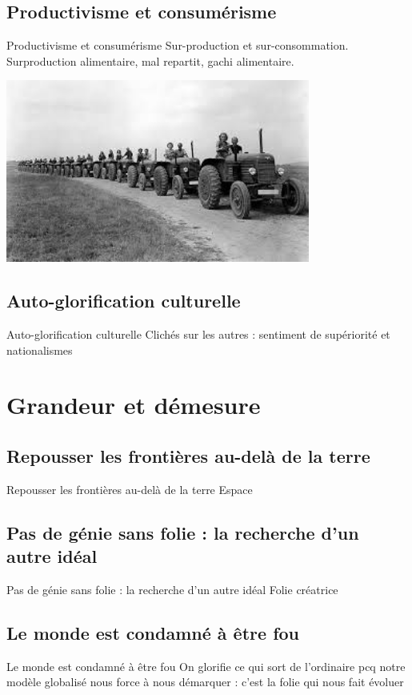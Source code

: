 \documentclass{beamer}
\begin{document}
\subsection{Productivisme et consumérisme}
\begin{frame}{Productivisme et consumérisme}
  Sur-production et sur-consommation.
  Surproduction alimentaire, mal repartit, gachi alimentaire.
  \begin{center}
    \includegraphics[width=10cm]{../Images/urss.png}
  \end{center}
\end{frame}

\subsection{Auto-glorification culturelle}
\begin{frame}{Auto-glorification culturelle}
  Clichés sur les autres : sentiment de supériorité et nationalismes
\end{frame}


\section{Grandeur et démesure}

\subsection{Repousser les frontières au-delà de la terre}
\begin{frame}{Repousser les frontières au-delà de la terre}
  Espace
\end{frame}

\subsection{Pas de génie sans folie : la recherche d'un autre idéal}
\begin{frame}{Pas de génie sans folie : la recherche d'un autre idéal}
  Folie créatrice
\end{frame}

\subsection{Le monde est condamné à être fou}
\begin{frame}{Le monde est condamné à être fou}
  On glorifie ce qui sort de l'ordinaire pcq notre modèle globalisé nous force à nous démarquer : c'est la folie qui nous fait évoluer
\end{frame}
\end{document}
